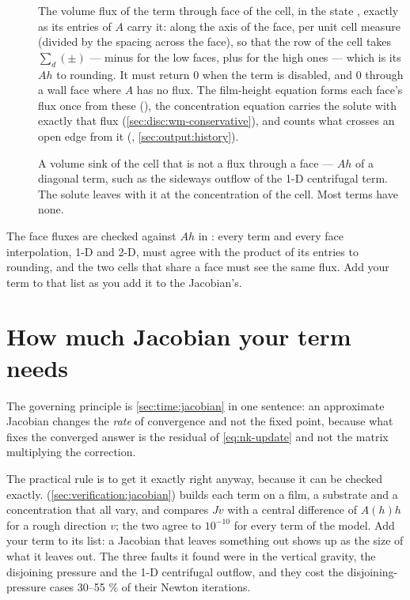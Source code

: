 \begin{description}
  \item[] The volume flux of the term through
    face  of the cell, in the state , exactly as its
    entries of $A$ carry it: along the axis of the face, per unit cell measure
    (divided by the spacing across the face), so that the row of the cell takes
    $\sum_d (\pm)$ --- minus for the low faces, plus for the
    high ones --- which is its $A h$ to rounding. It must return 0 when the term
    is disabled, and 0 through a wall face where $A$ has no flux. The
    film-height equation forms each face's flux once from these
    (), the concentration equation carries the
    solute with exactly that flux (\cref{sec:disc:wm-conservative}), and
     counts what crosses an open edge from it
    (, \cref{sec:output:history}).
  \item[] A volume sink of the cell that is not a
    flux through a face --- $A h$ of a diagonal term, such as the sideways
    outflow of the 1-D centrifugal term. The solute leaves with it at the
    concentration of the cell. Most terms have none.
\end{description}

The face fluxes are checked against $A h$ in :
every term and every face interpolation, 1-D and 2-D, must agree with the
product of its entries to rounding, and the two cells that share a face must
see the same flux. Add your term to that list as you add it to the Jacobian's.

\section{How much Jacobian your term needs}
\label{sec:extending:jacobian}

The governing principle is \cref{sec:time:jacobian} in one sentence: an
approximate Jacobian changes the \emph{rate} of convergence and not the fixed
point, because what fixes the converged answer is the residual of
\cref{eq:nk-update} and not the matrix multiplying the correction.

The practical rule is to get it exactly right anyway, because it can be
checked exactly. 
(\cref{sec:verification:jacobian}) builds each term on a film, a substrate and
a concentration that all vary, and compares $J v$ with a central difference of
$A(h)h$ for a rough direction $v$; the two agree to $10^{-10}$ for every term
of the model. Add your term to its list: a Jacobian that leaves something out
shows up as the size of what it leaves out. The three faults it found were in
the vertical gravity, the disjoining pressure and the 1-D centrifugal
outflow, and they cost the disjoining-pressure cases 30--55 \% of their
Newton iterations.

